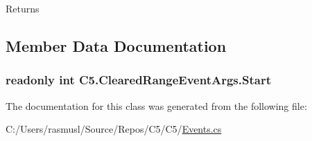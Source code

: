 \begin{DoxyReturn}{Returns}

\end{DoxyReturn}


\subsection{Member Data Documentation}
\hypertarget{class_c5_1_1_cleared_range_event_args_aa6c242b23ec6a07c3442a6c5b0cafd98}{}
\subsubsection[{Start}]{\setlength{\rightskip}{0pt plus 5cm}readonly int C5.\+Cleared\+Range\+Event\+Args.\+Start}\label{class_c5_1_1_cleared_range_event_args_aa6c242b23ec6a07c3442a6c5b0cafd98}






The documentation for this class was generated from the following file\+:\begin{DoxyCompactItemize}
\item 
C\+:/\+Users/rasmusl/\+Source/\+Repos/\+C5/\+C5/\hyperlink{_events_8cs}{Events.\+cs}\end{DoxyCompactItemize}
